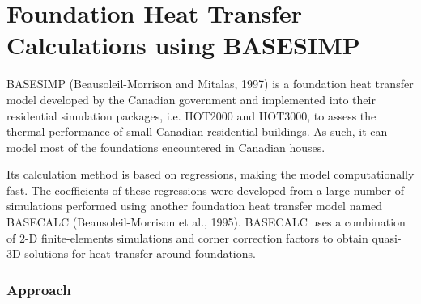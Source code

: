 \section{Foundation Heat Transfer Calculations using BASESIMP}\label{foundation-heat-transfer-calculations-using-basesimp}

BASESIMP (Beausoleil-Morrison and Mitalas, 1997) is a foundation heat transfer model developed by the Canadian government and implemented into their residential simulation packages, i.e. HOT2000 and HOT3000, to assess the thermal performance of small Canadian residential buildings.  As such, it can model most of the foundations encountered in Canadian houses.

Its calculation method is based on regressions, making the model computationally fast.  The coefficients of these regressions were developed from a large number of simulations performed using another foundation heat transfer model named BASECALC (Beausoleil-Morrison et al., 1995).  BASECALC uses a combination of 2-D finite-elements simulations and corner correction factors to obtain quasi-3D solutions for heat transfer around foundations.


\subsubsection{Approach}\label{approach-basesimp}

